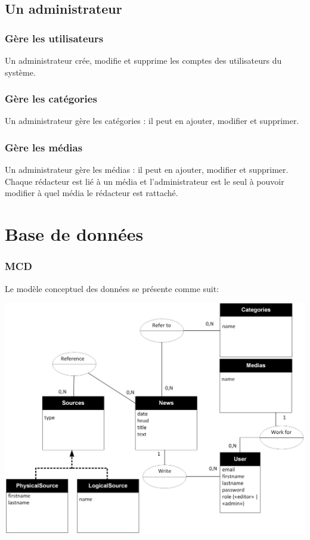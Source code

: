\documentclass{article}
\begin{document}
\subsection{Un administrateur}

\subsubsection{Gère les utilisateurs}

Un administrateur crée, modifie et supprime les comptes des utilisateurs du système.

\subsubsection{Gère les catégories}

Un administrateur gère les catégories : il peut en ajouter, modifier et supprimer.

\subsubsection{Gère les médias}

Un administrateur gère les médias : il peut en ajouter, modifier et supprimer. Chaque rédacteur est lié à un média et l'administrateur est le seul à pouvoir modifier à quel média le rédacteur est rattaché.

\newpage
\section{Base de données}

\subsubsection{MCD}

Le modèle conceptuel des données se présente comme suit:

\includegraphics[width=\textwidth]{mcd}
\end{document}
